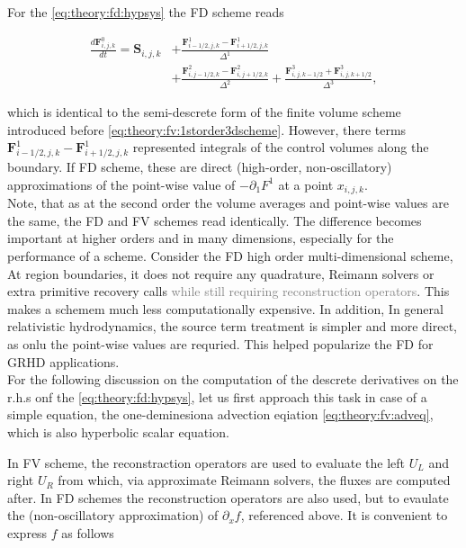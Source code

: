 \documentclass[11pt,a4paper,headinclude=true,DIV=14,BCOR=8mm,chapterprefix,listof=totoc,twoside,openright,abstracton]{scrbook}
\begin{document}
For the \ref{eq:theory:fd:hypsys} the FD scheme reads

\begin{align}
    \frac{d\boldsymbol{F}^{0}_{i,j,k}}{dt} = \boldsymbol{S}_{i,j,k} &+ \frac{\boldsymbol{F}^{1}_{i-1/2,j,k} - \boldsymbol{F}^{1}_{i+1/2,j,k}}{\Delta^1} \\
    & + \frac{\boldsymbol{F}^{2}_{i,j-1/2,k} - \boldsymbol{F}^{2}_{i,j+1/2,k}}{\Delta^2} + \frac{\boldsymbol{F}^{3}_{i,j,k-1/2} + \boldsymbol{F}^{3}_{i,j,k+1/2}}{\Delta^3},
\end{align}

which is identical to the semi-descrete form of the finite volume scheme introduced before \ref{eq:theory:fv:1storder3dscheme}. However, there terms $\boldsymbol{F}^{1}_{i-1/2,j,k} - \boldsymbol{F}^{1}_{i+1/2,j,k}$ represented integrals of the control volumes along the boundary. If FD scheme, these are direct (high-order, non-oscillatory) approximations of the point-wise value of $-\partial_1 F^1$ at a point $x_{i,j,k}$. \\

Note, that as at the second order the volume averages and point-wise values are the same, the FD and FV schemes read identically. The difference becomes important at higher orders and in many dimensions, especially for the performance of a scheme. Consider the FD high order multi-dimensional scheme, At region boundaries, it does not require any quadrature, Reimann solvers or extra primitive recovery calls \textcolor{gray}{while still requiring reconstruction operators}. This makes a schemem much less computationally expensive. In addition, In general relativistic hydrodynamics, the source term treatment is simpler and more direct, as onlu the point-wise values are requried. This helped popularize the FD for GRHD applications. \\

For the following discussion on the computation of the descrete derivatives on the r.h.s onf the \ref{eq:theory:fd:hypsys}, let us first approach this task in case of a simple equation, the one-deminesiona advection eqiation \ref{eq:theory:fv:adveq}, which is also hyperbolic scalar equation. 

In FV scheme, the reconstraction operators are used to evaluate the left $U_L$ and right $U_R$ from which, via approximate Reimann solvers, the fluxes are computed after. In FD schemes the reconstruction operators are also used, but to evaulate the (non-oscillatory approximation) of $\partial_x f$, referenced above. It is convenient to express $f$ as follows
\end{document}
